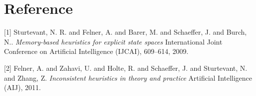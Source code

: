 \documentclass[twocolumn]{article}
\begin{document}
\section{Reference}

[1] Sturtevant, N. R. and Felner, A. and Barer, M. and Schaeffer, J. and Burch, N..
\textit{Memory-based heuristics for explicit state spaces}
International Joint Conference on Artificial Intelligence (IJCAI), 609--614, 2009.
\newline

[2] Felner, A. and Zahavi, U. and Holte, R. and Schaeffer, J. and Sturtevant, N. and Zhang, Z.
\textit{Inconsistent heuristics in theory and practice}
Artificial Intelligence (AIJ), 2011.
\newline
\end{document}
